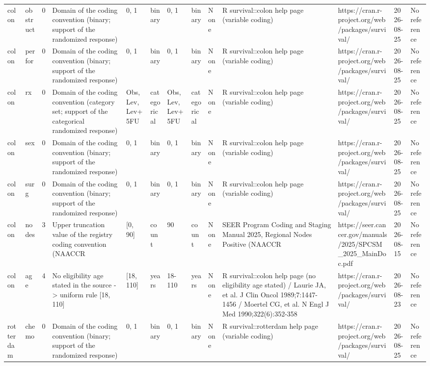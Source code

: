 \begin{tabular}{llrllllllllll}
  colon & obstruct & 0 & Domain of the coding convention (binary; support of the randomized response) & {0, 1} & binary & 0, 1 & binary & None & R survival::colon help page (variable coding) & https://cran.r-project.org/web/packages/survival/ & 2026-08-25 & No reference \\ 
  colon & perfor & 0 & Domain of the coding convention (binary; support of the randomized response) & {0, 1} & binary & 0, 1 & binary & None & R survival::colon help page (variable coding) & https://cran.r-project.org/web/packages/survival/ & 2026-08-25 & No reference \\ 
  colon & rx & 0 & Domain of the coding convention (category set; support of the categorical randomized response) & {Obs, Lev, Lev+5FU} & categorical & Obs, Lev, Lev+5FU & categorical & None & R survival::colon help page (variable coding) & https://cran.r-project.org/web/packages/survival/ & 2026-08-25 & No reference \\ 
  colon & sex & 0 & Domain of the coding convention (binary; support of the randomized response) & {0, 1} & binary & 0, 1 & binary & None & R survival::colon help page (variable coding) & https://cran.r-project.org/web/packages/survival/ & 2026-08-25 & No reference \\ 
  colon & surg & 0 & Domain of the coding convention (binary; support of the randomized response) & {0, 1} & binary & 0, 1 & binary & None & R survival::colon help page (variable coding) & https://cran.r-project.org/web/packages/survival/ & 2026-08-25 & No reference \\ 
  colon & nodes & 3 & Upper truncation value of the registry coding convention (NAACCR #820, code 90) & [0, 90] & count & 90 & count & None & SEER Program Coding and Staging Manual 2025, Regional Nodes Positive (NAACCR #820, p.197): '90 or more nodes are positive' & https://seer.cancer.gov/manuals/2025/SPCSM\_2025\_MainDoc.pdf & 2026-08-15 & No reference \\ 
  colon & age & 4 & No eligibility age stated in the source -> uniform rule [18, 110] & [18, 110] & years & 18-110 & years & None & R survival::colon help page (no eligibility age stated) / Laurie JA, et al. J Clin Oncol 1989;7:1447-1456 / Moertel CG, et al. N Engl J Med 1990;322(6):352-358 & https://cran.r-project.org/web/packages/survival/ & 2026-08-23 & No reference \\ 
  rotterdam & chemo & 0 & Domain of the coding convention (binary; support of the randomized response) & {0, 1} & binary & 0, 1 & binary & None & R survival::rotterdam help page (variable coding) & https://cran.r-project.org/web/packages/survival/ & 2026-08-25 & No reference \\ 

\end{tabular}
